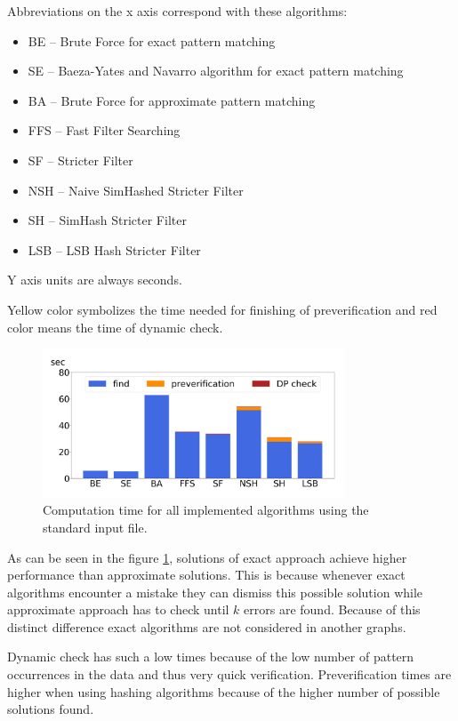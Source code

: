 Abbreviations on the x axis correspond with these algorithms:
\begin{itemize}
\item BE -- Brute Force for exact pattern matching
\item SE -- Baeza-Yates and Navarro algorithm for exact pattern matching
\item BA -- Brute Force for approximate pattern matching
\item FFS -- Fast Filter Searching
\item SF -- Stricter Filter
\item NSH -- Naive SimHashed Stricter Filter
\item SH -- SimHash Stricter Filter
\item LSB -- LSB Hash Stricter Filter
\end{itemize}

Y axis units are always seconds.

Yellow color symbolizes the time needed for finishing of preverification and red color means the time of dynamic check.

\begin{figure}[h]
\centering
\includegraphics[width=0.8\textwidth]{img/baseAll}
\caption{Computation time for all implemented algorithms using the standard input file.}
\label{fig_compT}
\end{figure}

As can be seen in the figure \ref{fig_compT}, solutions of exact approach achieve higher performance than approximate solutions. This is because whenever exact algorithms encounter a mistake they can dismiss this possible solution while approximate approach has to check until $k$ errors are found. Because of this distinct difference exact algorithms are not considered in another graphs.

Dynamic check has such a low times because of the low number of pattern occurrences in the data and thus very quick verification. Preverification times are higher when using hashing algorithms because of the higher number of possible solutions found.

